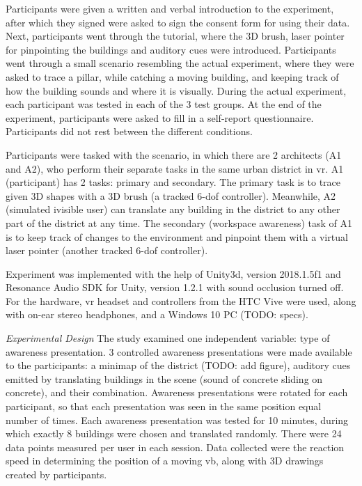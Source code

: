 Participants were given a written and verbal introduction to the experiment,
after which they signed were asked to sign the consent form for using their data.
Next, participants went through the tutorial, where the 3D brush, laser pointer for pinpointing the buildings and auditory cues were introduced. Participants went through a small scenario resembling the actual experiment, where they were asked to trace a pillar, while catching a moving building, and keeping track of how the building sounds and where it is visually.
During the actual experiment, each participant was tested in each of the 3 test groups.
At the end of the experiment, participants were asked to fill in a self-report questionnaire.
Participants did not rest between the different conditions. 

Participants were tasked with the scenario, in which there are 2 architects (A1 and A2), who perform their separate tasks in the same urban district in \gls{vr}. A1 (participant) has 2 tasks: primary and secondary. The primary task is to trace given 3D shapes with a 3D brush (a tracked 6-\gls{dof} controller). Meanwhile, A2 (simulated ivisible user) can translate any building in the district to any other part of the district at any time. The secondary (workspace awareness) task of A1 is to keep track of changes to the environment and pinpoint them with a virtual laser pointer (another tracked 6-\gls{dof} controller).

Experiment was implemented with the help of Unity3d, version  2018.1.5f1 and Resonance Audio SDK for Unity, version 1.2.1 with sound occlusion turned off. For the hardware, \gls{vr} headset and controllers from the HTC Vive were used, along with on-ear stereo headphones, and a Windows 10 PC (TODO: specs).

\textit{Experimental Design} 
The study examined one independent variable: type of awareness presentation. 3 controlled awareness presentations  were made available to the participants: a minimap of the district (TODO: add figure), auditory cues emitted by translating buildings in the scene (sound of concrete sliding on concrete), and their combination. Awareness presentations were rotated for each participant, so that each presentation was seen in the same position equal number of times. 
Each awareness presentation was tested for 10 minutes, during which exactly 8 buildings were chosen and translated randomly. There were 24 data points measured per user in each session. Data collected were the reaction speed in determining the position of a moving \gls{vb}, along with 3D drawings created by participants.

